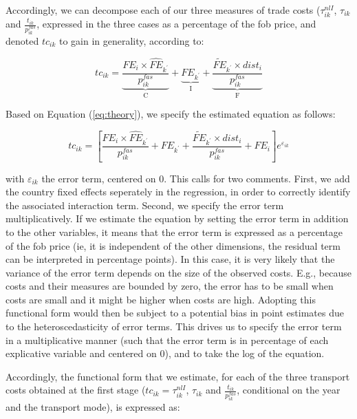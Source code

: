 \documentclass[a4paper,11pt]{article}
\begin{document}
Accordingly, we can decompose each of our three measures of trade costs ($\tau^{nlI}_{ik}$, $\tau_{ik}$ and $\frac{t_{ik}}{p^{fas}_{ik}}$, expressed in the three cases as a percentage of the fob price, and denoted $tc_{ik}$ to gain in generality, according to:

\begin{equation}
tc_{ik} = \underbrace{\frac{FE_i\times\widehat{FE}_{k^\prime}}{p^{fas}_{ik}}}_{\text{C}} + \underbrace{FE_{k^\prime}}_{\text{I}}+ \underbrace{\frac{\widetilde{FE}_{k^\prime}\times dist_i}{p_{ik}^{fas}}}_{\text{F}} \label{eq:theory}
\end{equation}

Based on Equation (\ref{eq:theory}), we specify the estimated equation as follows:

\begin{equation}
tc_{ik} = \left[\frac{FE_i\times\widehat{FE}_{k^\prime}}{p^{fas}_{ik}} + FE_{k^\prime}+ \frac{\widetilde{FE}_{k^\prime}\times dist_i}{p_{ik}^{fas}} + FE_i\right]e^{\varepsilon_{ik}} \label{eq:estim}
\end{equation}

with $\varepsilon_{ik}$ the error term, centered on 0. This calls for two comments. First, we add the country fixed effects seperately in the regression, in order to correctly identify the associated interaction term. Second, we specify the error term multiplicatively. If we estimate the equation by setting the error term in addition to the other variables, it means that the error term is expressed as a percentage of the fob price (ie, it is independent of the other dimensions, the residual term can be interpreted in percentage points). In this case, it is very likely that the variance of the error term depends on the size of the observed costs. E.g., because costs and their measures are bounded by zero, the error has to be small when costs are small and it might be higher when costs are high. Adopting this functional form would then be subject to a potential bias in point estimates due to the heteroscedasticity of error terms. This drives us to specify the error term in a multiplicative manner (such that the error term is in percentage of each explicative variable and centered on 0), and to take the log of the equation.

Accordingly, the functional form that we estimate, for each of the three transport costs obtained at the first stage ($tc_{ik} = \tau^{nlI}_{ik}$, $\tau_{ik}$ and $\frac{t_{ik}}{p^{fas}_{ik}}$, conditional on the year and the transport mode), is expressed as:
\end{document}

